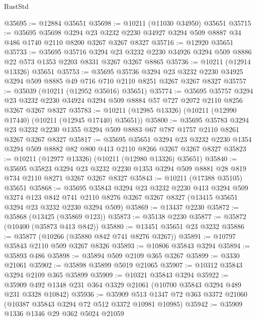 \begin{lexlean}{RustStd}
\begin{coremodule}
{\begin{coremodule}
{{{{{{{{{{{{{{{{{{{{{{{{{@35695 := @12884 @35651
@35698 := @10211 (@11030 @34950) @35651
@35715 := @35695
    @35698
    @3294
    @23
    @3232
    @2230
    @34927
    @3294
    @509
    @8887
    @34
    @486
    @1740
    @2110
    @8200
    @3267
    @3267
    @8327
@35716 := @12920 @35651
@35733 := @35695
    @35716
    @3294
    @23
    @3232
    @2230
    @34926
    @3294
    @509
    @8886
    @22
    @573
    @1353
    @2203
    @8331
    @3267
    @3267
    @8865
@35736 := @10211 (@12914 @13326) @35651
@35753 := @35695
    @35736
    @3294
    @23
    @3232
    @2230
    @34925
    @3294
    @509
    @8885
    @49
    @716
    @710
    @2110
    @8251
    @3267
    @3267
    @8327
@35757 := @35039 (@10211 (@12952 @35016) @35651)
@35774 := @35695
    @35757
    @3294
    @23
    @3232
    @2230
    @34924
    @3294
    @509
    @8884
    @57
    @727
    @2072
    @2110
    @8256
    @3267
    @3267
    @8327
@35783 := @10211 (@12985 @13326) (@10211 (@12990 @17440) (@10211 (@12945 @17440) @35651))
@35800 := @35695
    @35783
    @3294
    @23
    @3232
    @2230
    @1355
    @3294
    @509
    @8883
    @67
    @787
    @1757
    @2110
    @8261
    @3267
    @3267
    @8327
@35817 := @35695
    @35651
    @3294
    @23
    @3232
    @2230
    @1354
    @3294
    @509
    @8882
    @82
    @800
    @413
    @2110
    @8266
    @3267
    @3267
    @8327
@35823 := @10211 (@12977 @13326) (@10211 (@12980 @13326) @35651)
@35840 := @35695
    @35823
    @3294
    @23
    @3232
    @2230
    @1353
    @3294
    @509
    @8881
    @28
    @819
    @734
    @2110
    @8271
    @3267
    @3267
    @8327
@35843 := @10211 (@17388 @35105) @35651
@35868 := @35695
    @35843
    @3294
    @23
    @3232
    @2230
    @413
    @3294
    @509
    @3274
    @123
    @842
    @741
    @2110
    @8276
    @3267
    @3267
    @8327
    (@13415 @35651 @3294 @23 @3232 @2230 @3294 @509)
@35869 := @13437 @2230
@35872 := @35868 (@13425 (@35869 @123))
@35873 := @35138 @2230
@35877 := @35872 (@10400 (@35873 @413 @842))
@35880 := @13451 @35651 @23 @3232
@35886 := @35877 (@10266 (@35880 @842 @741 @8276 @3267))
@35891 := @10797 @35843 @2110 @509 @3267 @8326
@35893 := @10806 @35843 @3294
@35894 := @35893 @486
@35898 := @35894 @509 @2109 @365 @3267
@35899 := @3330 @21061
@35902 := @35898 @35899 @5019 @21065
@35907 := @10312 @35843 @3294 @2109 @365 @35899
@35909 := @10321 @35843 @3294
@35922 := @35909 @492 @1348 @231 @364 @3329 @21061 (@10700 @35843 @3294 @489 @231 @3328 @10842)
@35936 := @35909 @513 @1347 @72 @363 @3372 @21060 (@10387 @35843 @3294 @72 @512 @3372 @10981 @10985)
@35942 := @35909 @1336 @1346 @29 @362 @5024 @21059
}}}}}}}}}}}}}}}}}}}}}}}}}
\end{coremodule}}
\end{coremodule}
\end{lexlean}
